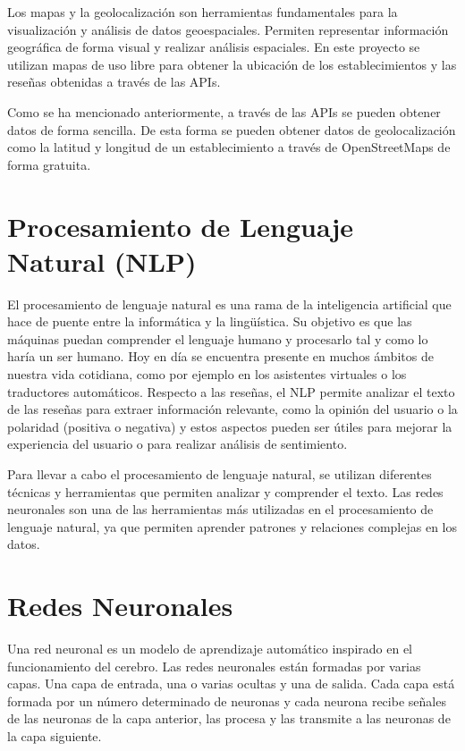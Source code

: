 Los mapas y la geolocalización son herramientas fundamentales para la visualización y análisis de datos geoespaciales.
Permiten representar información geográfica de forma visual y realizar análisis espaciales.
En este proyecto se utilizan mapas de uso libre para obtener la ubicación de los establecimientos y las reseñas obtenidas a través de las APIs.

Como se ha mencionado anteriormente, a través de las APIs se pueden obtener datos de forma sencilla.
De esta forma se pueden obtener datos de geolocalización como la latitud y longitud de un establecimiento a través de OpenStreetMaps de forma gratuita.

\section{Procesamiento de Lenguaje Natural (NLP)}

El procesamiento de lenguaje natural es una rama de la inteligencia artificial que hace de puente entre la informática y la lingüística. 
Su objetivo es que las máquinas puedan comprender el lenguaje humano y procesarlo tal y como lo haría un ser humano. \cite{udit:nlp}
Hoy en día se encuentra presente en muchos ámbitos de nuestra vida cotidiana, como por ejemplo en los asistentes virtuales o los traductores automáticos.
Respecto a las reseñas, el NLP permite analizar el texto de las reseñas para extraer información relevante, como la opinión del usuario o la polaridad (positiva o negativa) y estos aspectos pueden ser útiles para mejorar la experiencia del usuario o para realizar análisis de sentimiento.

Para llevar a cabo el procesamiento de lenguaje natural, se utilizan diferentes técnicas y herramientas que permiten analizar y comprender el texto.
Las redes neuronales son una de las herramientas más utilizadas en el procesamiento de lenguaje natural, ya que permiten aprender patrones y relaciones complejas en los datos.

\section{Redes Neuronales}

Una red neuronal es un modelo de aprendizaje automático inspirado en el funcionamiento del cerebro.
Las redes neuronales están formadas por varias capas. Una capa de entrada, una o varias ocultas y una de salida.
Cada capa está formada por un número determinado de neuronas y cada neurona recibe señales de las neuronas de la capa anterior, las procesa y las transmite a las neuronas de la capa siguiente.

